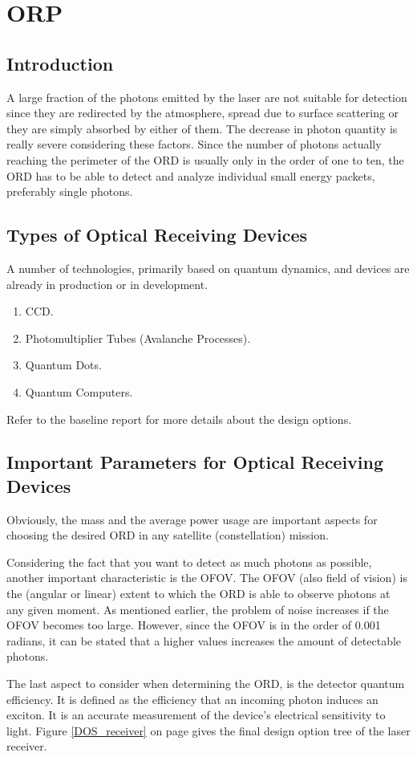 \section{\acl{ORP}}
\label{designOptionsReceiver}
\subsection{Introduction}
A large fraction of the photons emitted by the \acs{laser} are not suitable for detection since they are redirected by the atmosphere, spread due to surface scattering or they are simply absorbed by either of them. The decrease in photon quantity is really severe considering these factors. Since the number of photons actually reaching the perimeter of the \ac{ORD} is usually only in the order of one to ten, the \acs{ORD} has to be able to detect and analyze individual small energy packets, preferably single photons. 

\subsection{Types of Optical Receiving Devices}
	\label{blDOtypesORD}
A number of technologies, primarily based on quantum dynamics, and devices are already in production or in development. 
\begin{enumerate}[i]
	\item \ac{CCD}. 
	\item Photomultiplier Tubes (Avalanche Processes). 
	\item Quantum Dots. 
	\item Quantum Computers. 
\end{enumerate}
Refer to the baseline report for more details about the design options.

\subsection{Important Parameters for Optical Receiving Devices}
	\label{blDOparametersORD}
Obviously, the mass and the average power usage are important aspects for choosing the desired \acs{ORD} in any satellite (constellation) mission. 

Considering the fact that you want to detect as much photons as possible, another important characteristic is the \ac{OFOV}. The \acs{OFOV} (also field of vision) is the (angular or linear) extent to which the \acs{ORD} is able to observe photons at any given moment. As mentioned earlier, the problem of noise increases if the \acs{OFOV} becomes too large. However, since the \acs{OFOV} is in the order of 0.001 radians, it can be stated that a higher values increases the amount of detectable photons.

The last aspect to consider when determining the \acs{ORD}, is the detector quantum efficiency. It is defined as the efficiency that an incoming photon induces an exciton. It is an accurate measurement of the device's electrical sensitivity to light. 
Figure \ref{DOS_receiver} on page \pageref{DOS_receiver} gives the final design option tree of the laser receiver.
